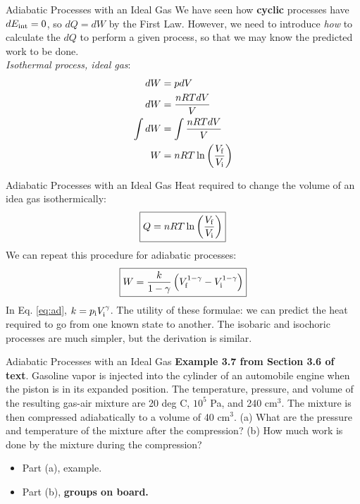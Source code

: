 \documentclass{beamer}
\begin{document}
\begin{frame}{Adiabatic Processes with an Ideal Gas}
We have seen how \textbf{cyclic} processes have $dE_{\rm int} = 0$, so $dQ = dW$ by the First Law.  However, we need to introduce \textit{how} to calculate the $dQ$ to perform a given process, so that we may know the predicted work to be done. \\ \vspace{0.5cm}
\textit{Isothermal process, ideal gas}:
\begin{align}
dW &= pdV \\
dW &= \frac{nRT dV}{V} \\
\int dW &= \int \frac{nRT dV}{V} \\
W &= nRT \ln\left(\frac{V_{\rm f}}{V_{\rm i}}\right)
\end{align}
\end{frame}

\begin{frame}{Adiabatic Processes with an Ideal Gas}
Heat required to change the volume of an idea gas isothermically:
\begin{equation}
\boxed{Q = nRT \ln\left(\frac{V_{\rm f}}{V_{\rm i}}\right)} \label{eq:isoT}
\end{equation}
We can repeat this procedure for adiabatic processes:
\begin{equation}
\boxed{W = \frac{k}{1-\gamma}\left(V_{\rm f}^{1-\gamma} - V_{\rm i}^{1-\gamma}\right)} \label{eq:ad}
\end{equation}
In Eq. \ref{eq:ad}, $k = p_{\rm i}V_{\rm i}^\gamma$.  The utility of these formulae: \alert{we can predict the heat required to go from one known state to another}.  The isobaric and isochoric processes are much simpler, but the derivation is similar.
\end{frame}

\begin{frame}{Adiabatic Processes with an Ideal Gas}
\small 
\textbf{Example 3.7 from Section 3.6 of text}.  Gasoline vapor is injected into the cylinder of an automobile engine when the piston is in its expanded position.
The temperature, pressure, and volume of the resulting gas-air mixture are 20 deg C, $10^5$ Pa, and 240 cm$^3$.  The mixture is then compressed adiabatically to a volume of 40 cm$^3$.  (a) What are the pressure and temperature of the mixture after the compression? (b) How much work is done by the mixture during the compression?
\begin{itemize}
\item Part (a), example.
\item Part (b), \textbf{groups on board.}
\end{itemize}
\end{frame}
\end{document}
